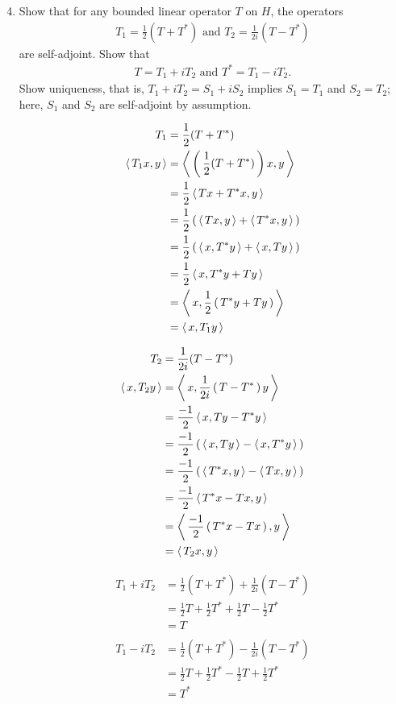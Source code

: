 \documentclass[10pt,a4paper]{report}
\begin{document}
\begin{enumerate}
	\setcounter{enumi}{3}
	\item Show that for any bounded linear operator $T$ on $H$, the operators 
	\begin{align*}
		T_1=\frac{1}{2}(T+T^*) \text{  and  } T_2=\frac{1}{2i}(T-T^*)
	\end{align*}are self-adjoint.  Show that 
	\begin{align*}
		T=T_1+iT_2 \text{ and }  T^*=T_1-iT_2.
	\end{align*}Show uniqueness, that is, $T_1+iT_2=S_1+iS_2$ implies $S_1=T_1$ and $S_2=T_2$; here, $S_1$ and $S_2$ are self-adjoint by assumption.

\begin{multicols}{2}	
	\begin{align*}
		T_1&=\frac{1}{2}(T+T^*) \\
		\left \langle\, T_1x, y \,\right \rangle &= \left \langle\, \left (\, \frac{1}{2}(T+T^*) \,\right )x, y \,\right \rangle \\
		&= \frac{1}{2}\left \langle\, Tx+T^*x, y \,\right \rangle \\
		&= \frac{1}{2}\left (\, \left \langle\, Tx, y \,\right \rangle +\left \langle\, T^*x, y \,\right \rangle  \,\right )\\
		&= \frac{1}{2}\left (\, \left \langle\, x, T^*y \,\right \rangle + \left \langle\, x, Ty \,\right \rangle \,\right ) \\
		&= \frac{1}{2}\left \langle\, x, T^*y +  Ty \,\right \rangle \\
		&= \left \langle\, x, \frac{1}{2}\left (\, T^*y +  Ty \,\right ) \,\right \rangle \\
		&= \left \langle\, x, T_1y \,\right \rangle
	\end{align*}
	
	\begin{align*}
		T_2&=\frac{1}{2i}(T-T^*) \\
		\left \langle\, x, T_2y \,\right \rangle &= \left \langle\, x, \frac{1}{2i}\left (\, T-T^* \,\right ) y \,\right \rangle \\
		&= \frac{-1}{2}\left \langle\, x, Ty-T^*y \,\right \rangle \\
		&= \frac{-1}{2}\left (\, \left \langle\, x, Ty \,\right \rangle -\left \langle\, x, T^*y \,\right \rangle  \,\right )\\
		&= \frac{-1}{2}\left (\, \left \langle\, T^*x, y \,\right \rangle - \left \langle\, Tx, y \,\right \rangle \,\right ) \\
		&= \frac{-1}{2}\left \langle\, T^*x -  Tx, y \,\right \rangle \\
		&= \left \langle\, \frac{-1}{2}\left (\, T^*x -  Tx \,\right ), y \,\right \rangle \\
		&= \left \langle\, T_2x, y \,\right \rangle
	\end{align*}	
\end{multicols}
\begin{multicols}{2}
	\begin{align*}
		T_1+iT_2 &= \frac{1}{2}(T+T^*) + \frac{1}{2i}(T-T^*) \\
		&= \frac{1}{2}T+\frac{1}{2}T^* + \frac{1}{2}T-\frac{1}{2}T^* \\
		&= T
	\end{align*}
	\begin{align*}
\\		T_1-iT_2 &= \frac{1}{2}(T+T^*) - \frac{1}{2i}(T-T^*) \\
		&= \frac{1}{2}T+\frac{1}{2}T^* - \frac{1}{2}T+\frac{1}{2}T^* \\
		&= T^*
	\end{align*}
\end{multicols}


\end{enumerate}
\end{document}
